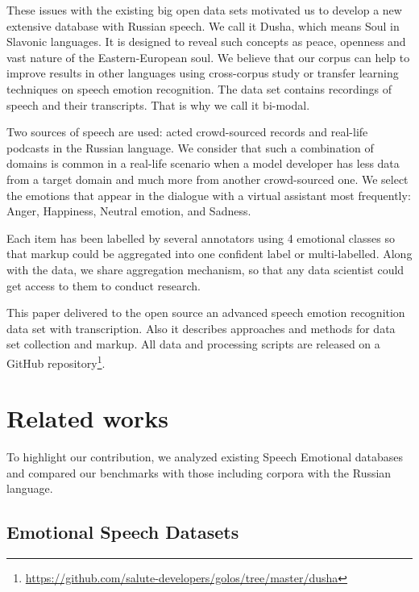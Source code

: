 \documentclass{article}
\begin{document}
These issues with the existing big open data sets motivated us to develop a new extensive database with Russian speech. We call it Dusha, which means Soul in Slavonic languages. It is designed to reveal such concepts as peace, openness and vast nature of the Eastern-European soul. We believe that our corpus can help to improve results in other languages using cross-corpus study \cite{milner2019cross} or transfer learning techniques on speech emotion recognition. The data set contains recordings of speech and their transcripts. That is why we call it bi-modal. 

Two sources of speech are used: acted crowd-sourced records and real-life podcasts in the Russian language. 
We consider that such a combination of domains is common in a real-life scenario when a model developer has less data from a target domain and much more from another crowd-sourced one.
We select the emotions that appear in the dialogue with a virtual assistant most frequently: Anger, Happiness, Neutral emotion, and Sadness.

Each item has been labelled by several annotators using 4 emotional classes so that markup could be aggregated into one confident label or multi-labelled. 
Along with the data, we share aggregation mechanism, so that any data scientist could get access to them to conduct research. 

This paper delivered to the open source an advanced speech emotion recognition data set with transcription. Also it describes approaches and methods for data set collection and markup. All data and processing scripts are released on a GitHub repository\footnote{\url{https://github.com/salute-developers/golos/tree/master/dusha}}.




\section{Related works}
\label{sec:format}

 To highlight our contribution, we analyzed existing Speech Emotional databases and compared our benchmarks with those including corpora with the Russian language. 

\subsection{Emotional Speech Datasets}
 
\end{document}
